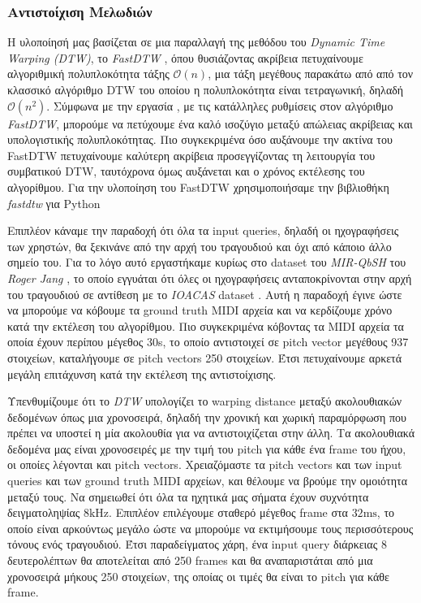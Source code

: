 \subsubsection{Αντιστοίχιση Μελωδιών}

Η υλοποίησή μας βασίζεται σε μια παραλλαγή της μεθόδου του \emph{Dynamic Time Warping (DTW)}, το \emph{FastDTW} \cite{salvador2007toward},
όπου θυσιάζοντας ακρίβεια πετυχαίνουμε αλγοριθμική πολυπλοκότητα τάξης $\mathcal{O}(n)$, μια τάξη μεγέθους παρακάτω από από τον κλασσικό
αλγόριθμο DTW του οποίου η πολυπλοκότητα είναι τετραγωνική, δηλαδή $\mathcal{O}(n^2)$. Σύμφωνα με την εργασία \cite{salvador2007toward},
με τις κατάλληλες ρυθμίσεις στον αλγόριθμο \emph{FastDTW}, μπορούμε να πετύχουμε ένα καλό ισοζύγιο μεταξύ απώλειας ακρίβειας και
υπολογιστικής πολυπλοκότητας. Πιο συγκεκριμένα όσο αυξάνουμε την ακτίνα του FastDTW πετυχαίνουμε καλύτερη ακρίβεια προσεγγίζοντας τη λειτουργία του συμβατικού DTW, ταυτόχρονα όμως αυξάνεται και ο χρόνος εκτέλεσης του αλγορίθμου. Για την υλοποίηση του FastDTW χρησιμοποιήσαμε την βιβλιοθήκη \emph{fastdtw} για Python \cite{fastdtwpython}

Επιπλέον κάναμε την παραδοχή ότι όλα τα input queries, δηλαδή οι ηχογραφήσεις των
χρηστών, θα ξεκινάνε από την αρχή του τραγουδιού και όχι από κάποιο άλλο σημείο του. Για το λόγο αυτό εργαστήκαμε κυρίως στο dataset του
\emph{MIR-QbSH} του \emph{Roger Jang} \cite{jang-dataset}, το οποίο εγγυάται ότι όλες οι ηχογραφήσεις ανταποκρίνονται στην αρχή του
τραγουδιού σε αντίθεση με το \emph{IOACAS} dataset \cite{IOACAS-dataset}. Αυτή η παραδοχή έγινε ώστε να 
μπορούμε να κόβουμε τα ground truth MIDI αρχεία και να κερδίζουμε χρόνο κατά την εκτέλεση του αλγορίθμου. Πιο 
συγκεκριμένα κόβοντας τα MIDI αρχεία τα οποία έχουν περίπου μέγεθος 30s, το οποίο αντιστοιχεί σε pitch vector 
μεγέθους 937 στοιχείων, καταλήγουμε σε pitch vectors 250 στοιχείων. Έτσι πετυχαίνουμε αρκετά μεγάλη επιτάχυνση 
κατά την εκτέλεση της αντιστοίχισης. 

Υπενθυμίζουμε ότι το \emph{DTW} υπολογίζει το warping distance μεταξύ ακολουθιακών δεδομένων όπως μια χρονοσειρά, δηλαδή την χρονική και
χωρική παραμόρφωση που πρέπει να υποστεί η μία ακολουθία για να αντιστοιχίζεται στην άλλη. Τα ακολουθιακά δεδομένα μας είναι χρονοσειρές
με την τιμή του pitch για κάθε ένα frame του ήχου, οι οποίες λέγονται και pitch vectors. Χρειαζόμαστε τα pitch vectors και των input queries
και των ground truth MIDI αρχείων, και θέλουμε να βρούμε την ομοιότητα μεταξύ τους. Να σημειωθεί ότι όλα τα ηχητικά μας σήματα έχουν
συχνότητα δειγματοληψίας $8 \mathrm{ kHz}$. Επιπλέον επιλέγουμε σταθερό μέγεθος frame στα $32 \mathrm{ ms}$, το οποίο είναι αρκούντως
μεγάλο ώστε να μπορούμε να εκτιμήσουμε τους περισσότερους τόνους ενός τραγουδιού. Έτσι παραδείγματος χάρη, ένα input query διάρκειας 8
δευτερολέπτων θα αποτελείται από 250 frames και θα αναπαριστάται από μια χρονοσειρά μήκους 250 στοιχείων, της οποίας οι τιμές θα είναι το
pitch για κάθε frame.
